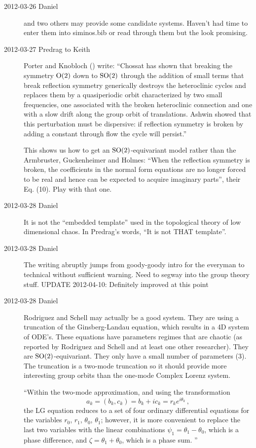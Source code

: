 \begin{description}
\item[2012-03-26 Daniel]  and two others may provide some
candidate systems. Haven't had time to enter them into siminos.bib or
read through them but the look promising.

\item[2012-03-27 Predrag to Keith]
Porter and Knobloch
()
write: ``Chossat has shown that breaking the symmetry
$\textrm{O}(2)$ down to $\textrm{SO}(2)$ through the addition of small terms that break
reflection symmetry generically destroys the heteroclinic cycles and
replaces them by a quasiperiodic orbit characterized by two small
frequencies, one associated with the broken heteroclinic connection and
one with a slow drift along the group orbit of translations. Ashwin
\etal{} showed that this perturbation must be dispersive: if
reflection symmetry is broken by adding a constant through flow the cycle
will persist.''

This shows us how to get an $\textrm{SO}(2)$-equivariant model rather than
the Armbruster, Guckenheimer and Holmes:
``When the reflection symmetry is broken, the coefficients in the normal
form equations are no longer forced to be real and hence can be expected
to acquire imaginary parts'', their Eq. (10). Play with that one.

\item[2012-03-28 Daniel]                        \toCB
It is not the ``embedded template'' used in the topological theory of low
dimensional chaos. In Predrag's words, ``It is not THAT template''.

\item[2012-03-28 Daniel]
   The writing abruptly jumps from goody-goody intro for the everyman to
   technical without sufficient warning. Need to segway into the group
   theory stuff. UPDATE 2012-04-10: Definitely improved at this point

\item[2012-03-28 Daniel]
Rodriguez and Schell may actually be a good system.
They are using a truncation of the Ginsberg-Landau equation, which
results in a 4D system of ODE's. These equations have parameters regimes
that are chaotic (as reported by Rodriguez and Schell and at least one
other researcher). They are $\textrm{SO}(2)$-equivariant. They only have a small
number of parameters (3). The truncation is a two-mode truncation so it
should provide more interesting group orbits than the one-mode Complex
Lorenz system.

``Within the two-mode approximation, and using
the transformation
\[ a_k = (b_k, c_k) = b_k + ic_k = r_k e^{i\theta_k}\,, \]
the LG equation reduces
to a set of four ordinary differential equations
for the variables $r_0$, $r_1$, $\theta_0$, $\theta_1$; however, it is more convenient
to replace the last two variables with the linear
combinations $\psi_1 = \theta_1 -\theta_0$, which is a phase
difference, and $\zeta = \theta_1 +\theta_0$, which is a phase sum.
''

\end{description}
